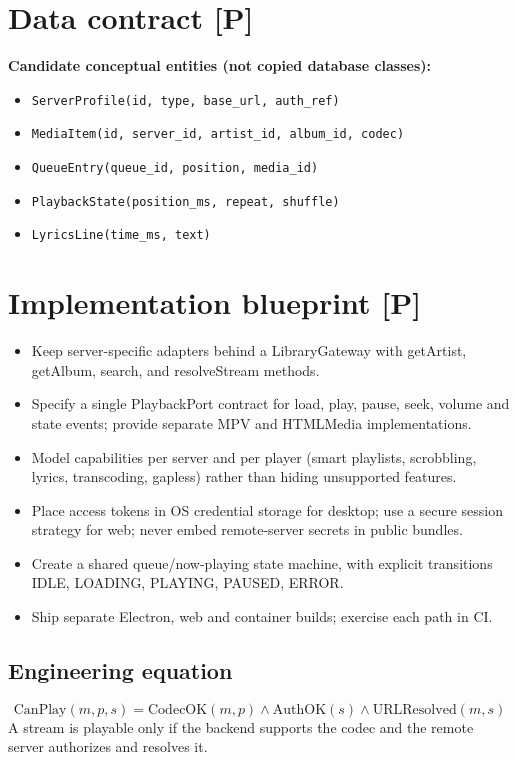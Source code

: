 \documentclass[10pt,a4paper,oneside]{report}
\begin{document}
\section{Data contract [P]}
\begin{evidencebox}\small\textbf{Candidate conceptual entities (not copied database classes):}\par
\begin{itemize}[leftmargin=*,itemsep=1pt,topsep=2pt]
\item \texttt{ServerProfile(id, type, base\_url, auth\_ref)}
\item \texttt{MediaItem(id, server\_id, artist\_id, album\_id, codec)}
\item \texttt{QueueEntry(queue\_id, position, media\_id)}
\item \texttt{PlaybackState(position\_ms, repeat, shuffle)}
\item \texttt{LyricsLine(time\_ms, text)}
\end{itemize}\end{evidencebox}
\section{Implementation blueprint [P]}
\begin{itemize}[leftmargin=*,itemsep=2pt,topsep=3pt]
\item Keep server-specific adapters behind a LibraryGateway with getArtist, getAlbum, search, and resolveStream methods.
\item Specify a single PlaybackPort contract for load, play, pause, seek, volume and state events; provide separate MPV and HTMLMedia implementations.
\item Model capabilities per server and per player (smart playlists, scrobbling, lyrics, transcoding, gapless) rather than hiding unsupported features.
\item Place access tokens in OS credential storage for desktop; use a secure session strategy for web; never embed remote-server secrets in public bundles.
\item Create a shared queue/now-playing state machine, with explicit transitions IDLE, LOADING, PLAYING, PAUSED, ERROR.
\item Ship separate Electron, web and container builds; exercise each path in CI.
\end{itemize}
\subsection*{Engineering equation}
\begin{equation*}\mathrm{CanPlay}(m,p,s)=\mathrm{CodecOK}(m,p)\land\mathrm{AuthOK}(s)\land\mathrm{URLResolved}(m,s)\end{equation*}
A stream is playable only if the backend supports the codec and the remote server authorizes and resolves it.\par
\end{document}
